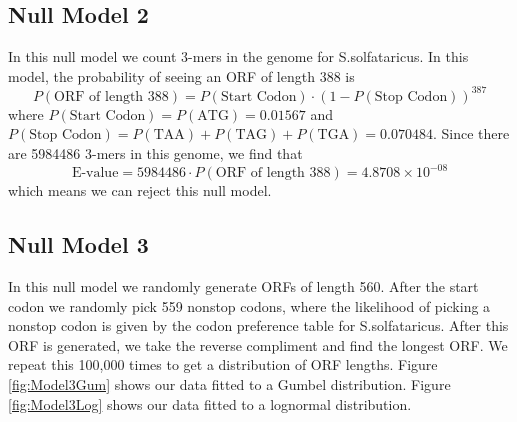 \documentclass[11pt]{article}
\begin{document}
\subsection{Null Model 2}
In this null model we count 3-mers in the genome for S.solfataricus.  In this model, the probability of seeing an ORF of length 388 is
\[P(\text{ORF of length 388}) = P(\text{Start Codon}) \cdot (1-P(\text{Stop Codon}))^{387} \]
where $P(\text{Start Codon}) = P(\text{ATG}) = 0.01567$ and $P(\text{Stop Codon}) = P(\text{TAA}) + P(\text{TAG}) + P(\text{TGA}) = 0.070484$.  Since there are 5984486 3-mers in this genome, we find that
\[\text{E-value} = 5984486 \cdot P(\text{ORF of length 388}) = 4.8708 \times 10^{-08}\]
which means we can reject this null model.

\subsection{Null Model 3} 
In this null model we randomly generate ORFs of length 560.  After the start codon we randomly pick 559 nonstop codons, where the likelihood of picking a nonstop codon is given by the codon preference table for S.solfataricus.  After this ORF is generated, we take the reverse compliment and find the longest ORF.  We repeat this 100,000 times to get a distribution of ORF lengths.  Figure \ref{fig:Model3Gum} shows our data fitted to a Gumbel distribution.  Figure \ref{fig:Model3Log} shows our data fitted to a lognormal distribution.
\end{document}
